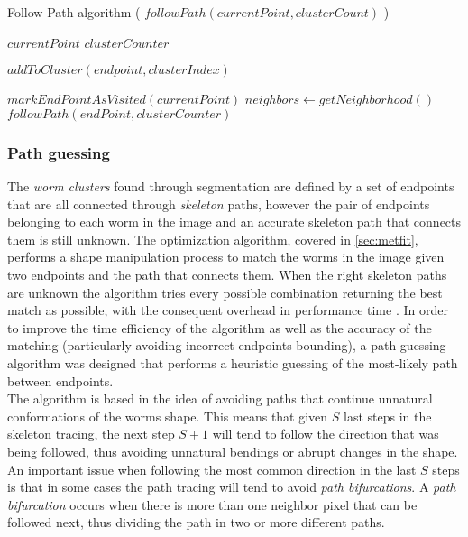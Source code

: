 \begin{algorithm}                     
\caption{Follow Path algorithm ( $followPath(currentPoint,clusterCount)$ )}         
\begin{algorithmic}                   

\REQUIRE $currentPoint$
\REQUIRE $clusterCounter$

\RETURN 
\ELSE
\STATE $addToCluster(endpoint,clusterIndex)$
\ENDIF

\STATE {}
\STATE $markEndPointAsVisited(currentPoint)$
\ENDIF
\STATE $neighbors \leftarrow getNeighborhood()$
\STATE $followPath(endPoint,clusterCounter)$
\ENDFOR

\end{algorithmic}
\end{algorithm}


\subsubsection*{Path guessing}
\label{sec:pathguessing}

The \emph{worm clusters} found through segmentation are defined by a set of endpoints
that are all connected through \emph{skeleton} paths, however the pair of endpoints
belonging to each worm in the image and an accurate skeleton path that
connects them is still unknown. The optimization algorithm, covered in \ref{sec:metfit},
performs a shape manipulation process to match the worms in the image given two endpoints
and the path that connects them. When the right skeleton paths are unknown the algorithm
tries every possible combination returning the best match as possible, with the 
consequent overhead in performance time . In order to improve the time efficiency of the 
algorithm as well as the accuracy of the matching (particularly avoiding incorrect
endpoints bounding), a path guessing algorithm was designed that performs a heuristic
guessing of the most-likely path between endpoints.\\

The algorithm is based in the idea of avoiding paths that continue unnatural conformations
of the worms shape. This means that given $S$ last steps in the skeleton tracing, the
next step $S+1$ will tend to follow the direction that was being followed, thus
avoiding unnatural bendings or abrupt changes in the shape. An important issue when 
following the most common direction in the last $S$ steps is that in some cases
the path tracing will tend to avoid \emph{path bifurcations}. 
A \emph{path bifurcation} occurs when there is more than one neighbor pixel that can be 
followed next, thus dividing the path in two or more different paths.\\

